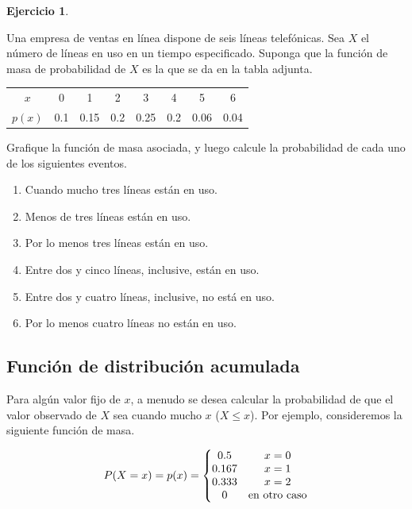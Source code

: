 \documentclass[
  11pt,
]{book}
\providecommand{\tightlist}{%
  \setlength{\itemsep}{0pt}\setlength{\parskip}{0pt}}
\theoremstyle{definition}
\theoremstyle{definition}
\theoremstyle{definition}
\newtheorem{exercise}{Ejercicio}[chapter]
\theoremstyle{definition}
\theoremstyle{remark}
\begin{document}
\begin{exercise}
\protect\hypertarget{exr:telefonica}{}\label{exr:telefonica}

Una empresa de ventas en línea dispone de seis líneas telefónicas. Sea \(X\) el número de líneas en uso en un tiempo especificado. Suponga que la función de masa de probabilidad de \(X\) es la que se da en la tabla adjunta.

\begin{table}[H]
\centering
\begin{tabular}[t]{cccccccc}
\toprule
$x$ & 0 & 1 & 2 & 3 & 4 & 5 & 6\\
$p(x)$ & 0.1 & 0.15 & 0.2 & 0.25 & 0.2 & 0.06 & 0.04\\
\bottomrule
\end{tabular}
\end{table}

Grafique la función de masa asociada, y luego calcule la probabilidad de cada uno de los siguientes eventos.

\begin{enumerate}
\def\labelenumi{\alph{enumi}.}
\tightlist
\item
  Cuando mucho tres líneas están en uso.
\item
  Menos de tres líneas están en uso.
\item
  Por lo menos tres líneas están en uso.
\item
  Entre dos y cinco líneas, inclusive, están en uso.
\item
  Entre dos y cuatro líneas, inclusive, no está en uso.
\item
  Por lo menos cuatro líneas no están en uso.
\end{enumerate}

\end{exercise}

\subsection{Función de distribución acumulada}\label{funciuxf3n-de-distribuciuxf3n-acumulada}

Para algún valor fijo de \(x\), a menudo se desea calcular la probabilidad de que el valor observado de \(X\) sea cuando mucho \(x\) (\(X \leq x\)). Por ejemplo, consideremos la siguiente función de masa.

\begin{equation}
\notag
\begin{split}
P(X = x) = p(x) = \left\lbrace
\begin{matrix}
0.5 & x = 0\\
0.167 & x = 1\\
0.333 & x = 2\\
0 & \text{en otro caso}\\
\end{matrix}
\right.
\end{split}
\end{equation}
\end{document}
